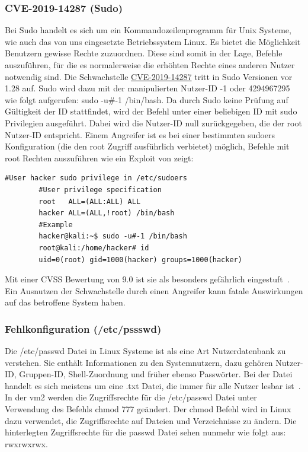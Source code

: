 \documentclass[10pt, a4paper,onecolumn ,titlepage]{article}
\begin{document}
    \subsubsection{CVE-2019-14287 (Sudo)}
    \label{subsubsec:sudo}
    Bei Sudo handelt es sich um ein Kommandozeilenprogramm für Unix Systeme, wie auch das von uns eingesetzte Betriebssystem Linux.
    Es bietet die Möglichkeit Benutzern gewisse Rechte zuzuordnen.
    Diese sind somit in der Lage, Befehle auszuführen, für die es normalerweise die erhöhten Rechte eines anderen Nutzer notwendig sind.
    Die Schwachstelle \href{https://www.cvedetails.com/cve/CVE-2019-14287/?q=CVE-2019-14287}{CVE-2019-14287} tritt in Sudo Versionen vor 1.28 auf.
    Sudo wird dazu mit der manipulierten Nutzer-ID -1 oder 4294967295 wie folgt aufgerufen: sudo -u\#-1 /bin/bash.
    Da durch Sudo keine Prüfung auf Gültigkeit der ID stattfindet, wird der Befehl unter einer beliebigen ID mit sudo Privilegien ausgeführt.
    Dabei wird die Nutzer-ID null zurückgegeben, die der root Nutzer-ID entspricht.
    Einem Angreifer ist es bei einer bestimmten sudoers Konfiguration (die den root Zugriff ausführlich verbietet) möglich, Befehle mit root Rechten auszuführen wie ein Exploit von \textcite{privilegeEscalationSudoExploit} zeigt:
    \vspace{0.5cm}
    \begin{lstlisting}[label={lst:examplesudo}]
        #User hacker sudo privilege in /etc/sudoers
        #User privilege specification
        root   ALL=(ALL:ALL) ALL
        hacker ALL=(ALL,!root) /bin/bash
        #Example
        hacker@kali:~$ sudo -u#-1 /bin/bash
        root@kali:/home/hacker# id
        uid=0(root) gid=1000(hacker) groups=1000(hacker)
    \end{lstlisting}
    \vspace{0.5}
    Mit einer CVSS Bewertung von 9.0 ist sie als besonders gefährlich eingestuft~\parencite{privilegeEscalationSudo}.
    Ein Ausnutzen der Schwachstelle durch einen Angreifer kann fatale Auswirkungen auf das betroffene System haben.



    \subsubsection{Fehlkonfiguration (/etc/pssswd)}
    \label{subsubsec:fehlkonfiguration}
    Die /etc/passwd Datei in Linux Systeme ist als eine Art Nutzerdatenbank zu verstehen.
    Sie enthält Informationen zu den Systemnutzern, dazu gehören Nutzer-ID, Gruppen-ID, Shell-Zuordnung und früher ebenso Passwörter.
    Bei der Datei handelt es sich meistens um eine .txt Datei, die immer für alle Nutzer lesbar ist~\parencite{privilegeEscalationPasswd}.
    In der \ac{vm}2 werden die Zugriffsrechte für die /etc/passwd Datei unter Verwendung des Befehls chmod 777 geändert.
    Der chmod Befehl wird in Linux dazu verwendet, die Zugriffsrechte auf Dateien und Verzeichnisse zu ändern.
    Die hinterlegten Zugriffsrechte für die passwd Datei sehen nunmehr wie folgt aus: rwxrwxrwx.
\end{document}

